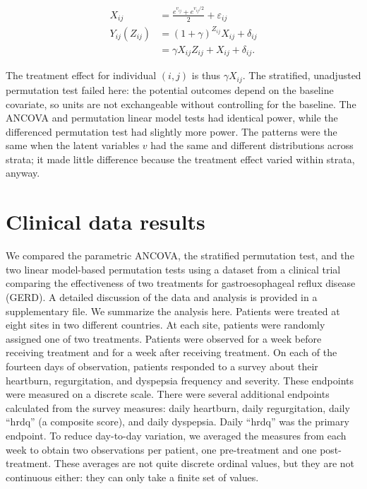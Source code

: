 \documentclass[12pt]{article}
\begin{document}
\begin{align*}
X_{ij} &=  \frac{ e^{v_{ij}} + e^{v_{ij}/2}}{2} +\varepsilon_{ij} \\
Y_{ij}(Z_{ij}) &= (1+\gamma)^{Z_{ij}} X_{ij}  + \delta_{ij} \\
&= \gamma X_{ij}Z_{ij} + X_{ij} + \delta_{ij}.
\end{align*}

The treatment effect for individual $(i, j)$ is thus $\gamma X_{ij}$.
The stratified, unadjusted permutation test failed here:
the potential outcomes depend on the baseline covariate, so units are not exchangeable without controlling for the baseline.
The ANCOVA and permutation linear model tests had identical power, while the differenced permutation test had slightly more power.
The patterns were the same when the latent variables $v$ had the same and different distributions across strata;
it made little difference because the treatment effect varied within strata, anyway.


\section{Clinical data results}\label{sec:results}
We compared the parametric ANCOVA, the stratified permutation test, and the two linear model-based permutation tests using a dataset from a clinical trial comparing the effectiveness of two treatments for gastroesophageal reflux disease (GERD).
A detailed discussion of the data and analysis is provided in a supplementary file.
We summarize the analysis here.
Patients were treated at eight sites in two different countries.
At each site, patients were randomly assigned one of two treatments.
Patients were observed for a week before receiving treatment and for a week after receiving treatment.
On each of the fourteen days of observation, patients responded to a survey about their heartburn, regurgitation, and dyspepsia frequency and severity.
These endpoints were measured on a discrete scale.
There were several additional endpoints calculated from the survey measures: daily heartburn, daily regurgitation, daily ``hrdq'' (a composite score), and daily dyspepsia.
Daily ``hrdq'' was the primary endpoint.
To reduce day-to-day variation, we averaged the measures from each week to obtain two observations per patient, one pre-treatment and one post-treatment.
These averages are not quite discrete ordinal values, but they are not continuous either: they can only take a finite set of values.
\end{document}
